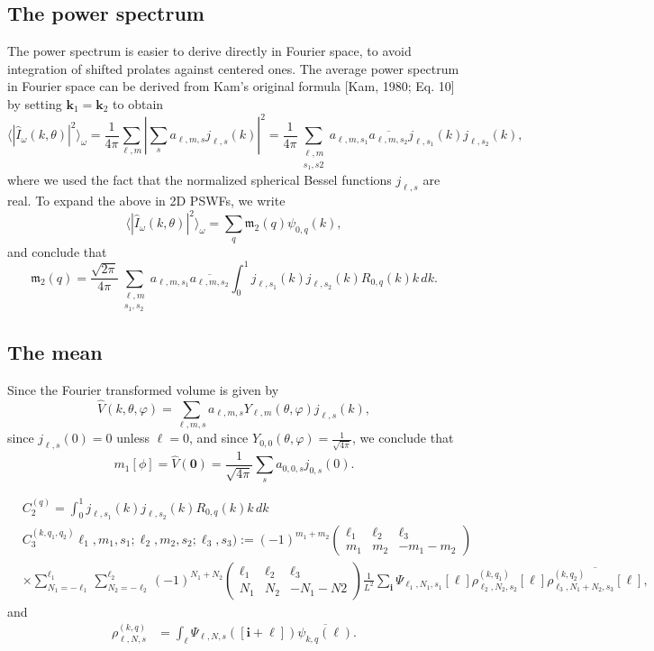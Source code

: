 \documentclass[english,11pt]{article}
\newcommand{\1}{\mathbf{1}}
\newcommand{\mb}{\mathbf}
\newcommand*\Bell{\ensuremath{\boldsymbol\ell}}
\numberwithin{equation}{section}
\theoremstyle{plain}
\theoremstyle{definition}
\theoremstyle{remark}
\theoremstyle{plain}
\theoremstyle{remark}
\theoremstyle{plain}
\theoremstyle{plain}
\begin{document}
\subsection{The power spectrum}
The power spectrum is easier to derive directly in Fourier space, to
avoid integration of shifted prolates against centered ones. The
average power spectrum in Fourier space can be derived from Kam's
original formula [Kam, 1980; Eq. 10] by setting $\mb k_1 = \mb k_2$ to
obtain
\[ \langle |\widehat I_{\omega}(k,\theta)|^2\rangle_{\omega} =
\frac{1}{4\pi}\sum_{\ell,
	m}\left|\sum_sa_{\ell,m,s}j_{\ell,s}(k)\right|^2 =
\frac{1}{4\pi}\sum_{\substack{\ell,m\\s_1,s2}}a_{\ell,m,s_1}\overline{a_{\ell,m,s_2}}j_{\ell,s_1}(k)j_{\ell,s_2}(k),\]
where we used the fact that the normalized spherical Bessel functions
$j_{\ell,s}$ are real. To expand the above in 2D PSWFs, we write
\[ \langle |\widehat I_{\omega}(k,\theta)|^2\rangle_{\omega} =
\sum_{q}\mathfrak{m}_2(q)\psi_{0,q}(k),\]
and conclude that
\[ \mathfrak{m}_2(q) =
\frac{\sqrt{2\pi}}{4\pi}\sum_{\substack{\ell,m\\s_1,s_2}}a_{\ell,m,s_1}\overline{a_{\ell,m,s_2}}
\int_0^1j_{\ell,s_1}(k)j_{\ell,s_2}(k)R_{0,q}(k)k\, dk.\]

\subsection{The mean}

Since the Fourier transformed volume is given by
\[ \widehat V(k,\theta,\varphi) =
\sum_{\ell,m,s}a_{\ell,m,s}Y_{\ell,m}(\theta,\varphi)j_{\ell,s}(k),\]
since $j_{\ell,s}(0)=0$ unless $\ell=0$, and since
$Y_{0,0}(\theta,\varphi) = \frac{1}{\sqrt{4\pi}}$, we conclude that
\[ m_1[\phi] = \widehat V(\mb 0) = \frac{1}{\sqrt{4\pi}}\sum_sa_{0,0,s}j_{0,s}(0).\]


\begin{align*}
&C_2^{(q)} = \int_0^1j_{\ell,s_1}(k)j_{\ell,s_2}(k)R_{0,q}(k)k\, dk\\
&C_3^{(k,q_1,q_2)}\ell_1,m_1,s_1;\ell_2,m_2,s_2;\ell_3,s_3):= (-1)^{m_1+m_2}\left(\begin{array}{ccc}\ell_1 & \ell_2  & \ell_3\\ m_1 & m_2 & -m_1-m_2\end{array}\right)\\
&\times \sum_{N_1=-\ell_1}^{\ell_1}\sum_{N_2=-\ell_2}^{\ell_2}(-1)^{N_1+N_2}\left(\begin{array}{ccc}\ell_1 & \ell_2  & \ell_3\\ N_1 & N_2 & -N_1-N2\end{array}\right)\frac{1}{L^2}\sum_{\mb i}\Psi_{\ell_1,N_1,s_1}[\Bell]\rho_{\ell_2,N_2,s_2}^{(k,q_1)}[\Bell]\overline{\rho_{\ell_3,N_1+N_2,s_3}^{(k,q_2)}[\Bell]},
\end{align*}
and 
\begin{align*}
\rho_{\ell,N,s}^{(k,q)}&=\int_{\Bell}\Psi_{\ell,N,s}([\mb i+\Bell])\overline{\psi_{k,q}(\Bell)}.
\end{align*}
\end{document}
